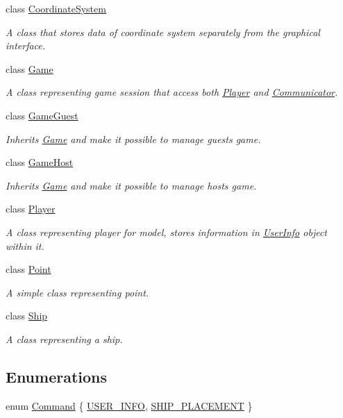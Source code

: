\begin{DoxyCompactItemize}
class \hyperlink{classMODEL_1_1CoordinateSystem}{Coordinate\+System}
\begin{DoxyCompactList}\small\item\em A class that stores data of coordinate system separately from the graphical interface. \end{DoxyCompactList}\item 
class \hyperlink{classMODEL_1_1Game}{Game}
\begin{DoxyCompactList}\small\item\em A class representing game session that access both \hyperlink{classMODEL_1_1Player}{Player} and \hyperlink{classMODEL_1_1Communicator}{Communicator}. \end{DoxyCompactList}\item 
class \hyperlink{classMODEL_1_1GameGuest}{Game\+Guest}
\begin{DoxyCompactList}\small\item\em Inherits \hyperlink{classMODEL_1_1Game}{Game} and make it possible to manage guests game. \end{DoxyCompactList}\item 
class \hyperlink{classMODEL_1_1GameHost}{Game\+Host}
\begin{DoxyCompactList}\small\item\em Inherits \hyperlink{classMODEL_1_1Game}{Game} and make it possible to manage hosts game. \end{DoxyCompactList}\item 
class \hyperlink{classMODEL_1_1Player}{Player}
\begin{DoxyCompactList}\small\item\em A class representing player for model, stores information in \hyperlink{classUserInfo}{User\+Info} object within it. \end{DoxyCompactList}\item 
class \hyperlink{classMODEL_1_1Point}{Point}
\begin{DoxyCompactList}\small\item\em A simple class representing point. \end{DoxyCompactList}\item 
class \hyperlink{classMODEL_1_1Ship}{Ship}
\begin{DoxyCompactList}\small\item\em A class representing a ship. \end{DoxyCompactList}\end{DoxyCompactItemize}
\subsection*{Enumerations}
\begin{DoxyCompactItemize}
\item 
enum \hyperlink{namespaceMODEL_a2afce0a47a93eee73a314d53e4890153}{Command} \{ \hyperlink{namespaceMODEL_a2afce0a47a93eee73a314d53e4890153a53e95d4aedd7db4fe9f58af71525d56a}{U\+S\+E\+R\+\_\+\+I\+N\+FO}, 
\hyperlink{namespaceMODEL_a2afce0a47a93eee73a314d53e4890153a8f686af5a9b889f9a227dfd8862a81d4}{S\+H\+I\+P\+\_\+\+P\+L\+A\+C\+E\+M\+E\+NT}
 \}
\end{DoxyCompactItemize}


